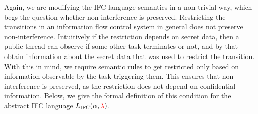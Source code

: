 \documentclass{sigplanconf}
\newcommand{\Red}[1]{{\color{red} #1}}
\begin{document}
Again, we are modifying the IFC language semantics in a non-trivial way,
which begs the question whether non-interference is preserved.
Restricting the transitions in an information flow control
system in general does not preserve non-interference.  Intuitively
if the restriction depends on secret data, then a public thread
can observe if some other task terminates or not, and by that obtain
information about the secret data that was used to restrict the
transition.
With this in mind, we require semantic rules to get restricted only
based on information observable by the task triggering them.
This ensures that non-interference is preserved, as the
restriction does not depend on confidential information.
Below, we give the formal definition of this condition for the
abstract IFC language \ensuremath{L_\text{IFC}(\alpha,\Red{\lambda})}.




  
  
\end{document}
